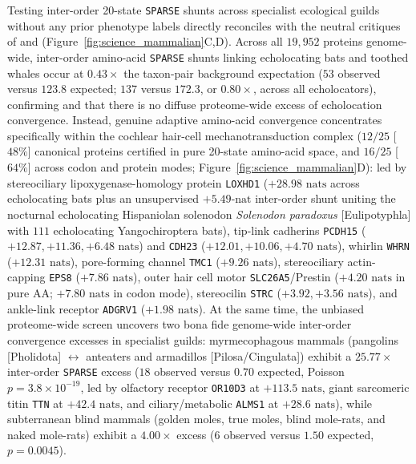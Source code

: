 \documentclass[11pt,a4paper]{article}
\begin{document}
Testing inter-order 20-state \texttt{SPARSE} shunts across specialist ecological guilds without any prior phenotype labels directly reconciles \citet{parker2013genome} with the neutral critiques of \citet{zou2015no} and \citet{thomas2015molecular} (Figure~\ref{fig:science_mammalian}C,D). Across all $19,952$ proteins genome-wide, inter-order amino-acid \texttt{SPARSE} shunts linking echolocating bats and toothed whales occur at $0.43\times$ the taxon-pair background expectation ($53$ observed versus $123.8$ expected; $137$ versus $172.3$, or $0.80\times$, across all echolocators), confirming \citet{zou2015no} and \citet{thomas2015molecular} that there is no diffuse proteome-wide excess of echolocation convergence. Instead, genuine adaptive amino-acid convergence concentrates specifically within the cochlear hair-cell mechanotransduction complex ($12 / 25$ [$48\%$] canonical proteins certified in pure 20-state amino-acid space, and $16 / 25$ [$64\%$] across codon and protein modes; Figure~\ref{fig:science_mammalian}D): led by stereociliary lipoxygenase-homology protein \texttt{LOXHD1} ($+28.98\text{ nats}$ across echolocating bats plus an unsupervised $+5.49\text{-nat}$ inter-order shunt uniting the nocturnal echolocating Hispaniolan solenodon \textit{Solenodon paradoxus} [Eulipotyphla] with $111$ echolocating Yangochiroptera bats), tip-link cadherins \texttt{PCDH15} ($+12.87, +11.36, +6.48\text{ nats}$) and \texttt{CDH23} ($+12.01, +10.06, +4.70\text{ nats}$), whirlin \texttt{WHRN} ($+12.31\text{ nats}$), pore-forming channel \texttt{TMC1} ($+9.26\text{ nats}$), stereociliary actin-capping \texttt{EPS8} ($+7.86\text{ nats}$), outer hair cell motor \texttt{SLC26A5}/Prestin ($+4.20\text{ nats}$ in pure AA; $+7.80\text{ nats}$ in codon mode), stereocilin \texttt{STRC} ($+3.92, +3.56\text{ nats}$), and ankle-link receptor \texttt{ADGRV1} ($+1.98\text{ nats}$). At the same time, the unbiased proteome-wide screen uncovers two bona fide genome-wide inter-order convergence excesses in specialist guilds: myrmecophagous mammals (pangolins [Pholidota] $\leftrightarrow$ anteaters and armadillos [Pilosa/Cingulata]) exhibit a $25.77\times$ inter-order \texttt{SPARSE} excess ($18$ observed versus $0.70$ expected, Poisson $p = 3.8 \times 10^{-19}$, led by olfactory receptor \texttt{OR10D3} at $+113.5\text{ nats}$, giant sarcomeric titin \texttt{TTN} at $+42.4\text{ nats}$, and ciliary/metabolic \texttt{ALMS1} at $+28.6\text{ nats}$), while subterranean blind mammals (golden moles, true moles, blind mole-rats, and naked mole-rats) exhibit a $4.00\times$ excess ($6$ observed versus $1.50$ expected, $p = 0.0045$).
\end{document}
